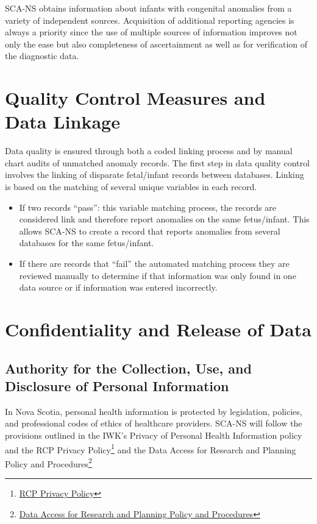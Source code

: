 \documentclass[
]{krantz}
\begin{document}
SCA-NS obtains information about infants with congenital anomalies from a variety of independent sources. Acquisition of additional reporting agencies is always a priority since the use of multiple sources of information improves not only the ease but also completeness of ascertainment as well as for verification of the diagnostic data.

\hypertarget{section13}{%
\section{Quality Control Measures and Data Linkage}\label{section13}}

Data quality is ensured through both a coded linking process and by manual chart audits of unmatched anomaly records. The first step in data quality control involves the linking of disparate fetal/infant records between databases. Linking is based on the matching of several unique variables in each record.

\begin{itemize}
\item
  If two records ``pass'': this variable matching process, the records are considered link and therefore report anomalies on the same fetus/infant. This allows SCA-NS to create a record that reports anomalies from several databases for the same fetus/infant.
\item
  If there are records that ``fail'' the automated matching process they are reviewed manually to determine if that information was only found in one data source or if information was entered incorrectly.
\end{itemize}

\hypertarget{section14}{%
\section{Confidentiality and Release of Data}\label{section14}}

\hypertarget{authority-for-the-collection-use-and-disclosure-of-personal-information}{%
\subsection*{Authority for the Collection, Use, and Disclosure of Personal Information}\label{authority-for-the-collection-use-and-disclosure-of-personal-information}}


In Nova Scotia, personal health information is protected by legislation, policies, and professional codes of ethics of healthcare providers. SCA-NS will follow the provisions outlined in the IWK's Privacy of Personal Health Information policy and the RCP Privacy Policy\footnote{ \href{http://rcp.nshealth.ca/about/privacy-personal-information}{RCP Privacy Policy}} and the Data Access for Research and Planning Policy and Procedures\footnote{ \href{https://rcp.nshealth.ca/sites/default/files/atlee-database/nsapd_data_access_policy_nov2007.pdf}{Data Access for Research and Planning Policy and Procedures}}
\end{document}
